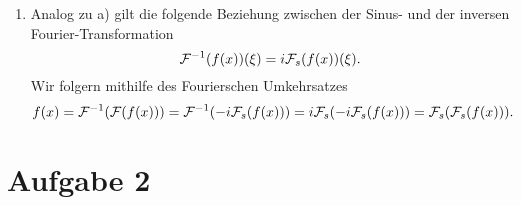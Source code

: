 \documentclass{exercise}
\begin{document}
\begin{enumerate}
        \item Analog zu a) gilt die folgende Beziehung zwischen der Sinus- und der inversen Fourier-Transformation
        \[
            \mathcal{F}^{-1}\parentheses*{f\parentheses*{x}}\parentheses*{\xi} = i\mathcal{F}_s\parentheses*{f\parentheses*{x}}\parentheses*{\xi}.
        \]
        Wir folgern mithilfe des Fourierschen Umkehrsatzes
        \[
            f\parentheses*{x} = \mathcal{F}^{-1}\parentheses*{\mathcal{F}\parentheses*{f\parentheses*{x}}} = \mathcal{F}^{-1}\parentheses*{-i\mathcal{F}_s\parentheses*{f\parentheses*{x}}} = i\mathcal{F}_s\parentheses*{-i\mathcal{F}_s\parentheses*{f\parentheses*{x}}} = \mathcal{F}_s\parentheses*{\mathcal{F}_s\parentheses*{f\parentheses*{x}}}.
        \]
    \end{enumerate}


    \section*{Aufgabe 2}
    
\end{document}
